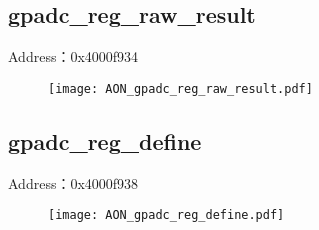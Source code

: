 \subsection{gpadc\_reg\_raw\_result}
\label{AON-gpadc-reg-raw-result}
Address：0x4000f934
\begin{figure}[H]
	\texttt{[image: AON\_gpadc\_reg\_raw\_result.pdf]}
\end{figure}

\subsection{gpadc\_reg\_define}
\label{AON-gpadc-reg-define}
Address：0x4000f938
\begin{figure}[H]
	\texttt{[image: AON\_gpadc\_reg\_define.pdf]}
\end{figure}

